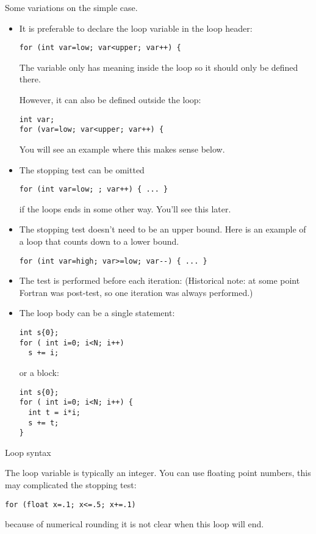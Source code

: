 Some variations on the simple case.
\begin{itemize}
\item It is preferable to declare the loop variable in the loop
header:
\begin{lstlisting}
for (int var=low; var<upper; var++) {
\end{lstlisting}
The variable only has
meaning inside the loop so it should only be defined there.

However, it can also be defined outside the loop:
\begin{lstlisting}
int var;
for (var=low; var<upper; var++) {
\end{lstlisting}
You will see an example where this makes sense below.
 
\item The stopping test can be omitted
\begin{lstlisting}
for (int var=low; ; var++) { ... }
\end{lstlisting}
if the loops ends in some other way. You'll see this later.
\item The stopping test doesn't need to be an upper bound. Here is an
  example of a loop that counts down to a lower bound.
\begin{lstlisting}
for (int var=high; var>=low; var--) { ... }
\end{lstlisting}
\item The test is performed before each iteration:
  (Historical note: at some point Fortran was post-test, so one
  iteration was always performed.)
\item The loop body can be a single statement:
\begin{lstlisting}
int s{0};
for ( int i=0; i<N; i++)
  s += i;
\end{lstlisting}
or a block:
\begin{lstlisting}
int s{0};
for ( int i=0; i<N; i++) {
  int t = i*i;
  s += t;
}
\end{lstlisting}
\end{itemize}

 {Loop syntax}

The loop variable is typically an integer. You can use floating point
numbers, this may complicated the stopping test:
\begin{lstlisting}
for (float x=.1; x<=.5; x+=.1)
\end{lstlisting}
because of numerical rounding it is not clear when this loop will end.

